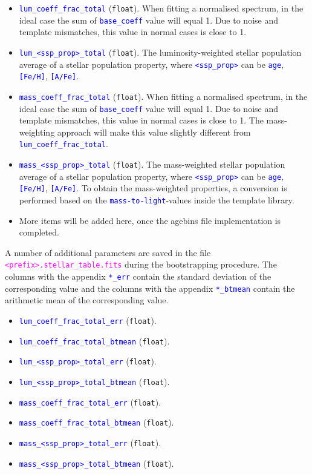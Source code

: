 \documentclass[usenatbib,usegraphicx,useAMS,onecolumn]{mn2e}
\newcommand{\codeline}[1]{\lstinline|#1|}
\newcommand{\tblcol}[1]{\textcolor{blue}{\codeline{#1}}}
\newcommand{\fname}[1]{\textcolor{magenta}{\codeline{#1}}}
\begin{document}
\begin{itemize}
    \item \tblcol{lum_coeff_frac_total} (\texttt{float}).
        When fitting a normalised spectrum, in the ideal case the sum of \tblcol{base_coeff} value will equal 1.
        Due to noise and template mismatches, this value in normal cases is close to 1.
    \item \tblcol{lum_<ssp_prop>_total} (\texttt{float}).
        The luminosity-weighted stellar population average of a stellar population property, where \tblcol{<ssp_prop>} can be \tblcol{age}, \tblcol{[Fe/H]}, \tblcol{[A/Fe]}.
    \item \tblcol{mass_coeff_frac_total} (\texttt{float}).
        When fitting a normalised spectrum, in the ideal case the sum of \tblcol{base_coeff} value will equal 1.
        Due to noise and template mismatches, this value in normal cases is close to 1.
        The mass-weighting approach will make this value slightly different from \tblcol{lum_coeff_frac_total}.
    \item \tblcol{mass_<ssp_prop>_total} (\texttt{float}).
        The mass-weighted stellar population average of a stellar population property, where \tblcol{<ssp_prop>} can be \tblcol{age}, \tblcol{[Fe/H]}, \tblcol{[A/Fe]}.
        To obtain the mass-weighted properties, a conversion is performed based on the \tblcol{mass-to-light}-values inside the template library.
    \item More items will be added here, once the agebins file implementation is completed.
\end{itemize}
A number of additional parameters are saved in the file \fname{<prefix>.stellar_table.fits} during the bootstrapping procedure. The columns with the appendix \tblcol{*_err} contain the standard deviation of the corresponding value and the columns with the appendix \tblcol{*_btmean} contain the arithmetic mean of the corresponding value.
\begin{itemize}
    \item \tblcol{lum_coeff_frac_total_err} (\texttt{float}).
     \item \tblcol{lum_coeff_frac_total_btmean} (\texttt{float}).
    \item \tblcol{lum_<ssp_prop>_total_err} (\texttt{float}).
    \item \tblcol{lum_<ssp_prop>_total_btmean} (\texttt{float}).
    \item \tblcol{mass_coeff_frac_total_err} (\texttt{float}).
     \item \tblcol{mass_coeff_frac_total_btmean} (\texttt{float}).
    \item \tblcol{mass_<ssp_prop>_total_err} (\texttt{float}).
     \item \tblcol{mass_<ssp_prop>_total_btmean} (\texttt{float}).
\end{itemize}
\end{document}
